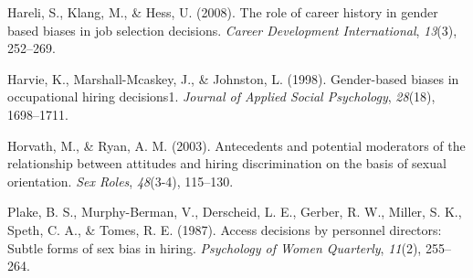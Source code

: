 \documentclass[english,man]{apa6}
\theoremstyle{definition}
\theoremstyle{definition}
\theoremstyle{remark}
\begin{document}
\setlength{\parindent}{-0.5in} \setlength{\leftskip}{0.5in}

\hypertarget{refs}{}
\hypertarget{ref-hareli2008role}{}
Hareli, S., Klang, M., \& Hess, U. (2008). The role of career history in
gender based biases in job selection decisions. \emph{Career Development
International}, \emph{13}(3), 252--269.

\hypertarget{ref-harvie1998gender}{}
Harvie, K., Marshall-Mcaskey, J., \& Johnston, L. (1998). Gender-based
biases in occupational hiring decisions1. \emph{Journal of Applied
Social Psychology}, \emph{28}(18), 1698--1711.

\hypertarget{ref-horvath2003antecedents}{}
Horvath, M., \& Ryan, A. M. (2003). Antecedents and potential moderators
of the relationship between attitudes and hiring discrimination on the
basis of sexual orientation. \emph{Sex Roles}, \emph{48}(3-4), 115--130.

\hypertarget{ref-plake1987access}{}
Plake, B. S., Murphy-Berman, V., Derscheid, L. E., Gerber, R. W.,
Miller, S. K., Speth, C. A., \& Tomes, R. E. (1987). Access decisions by
personnel directors: Subtle forms of sex bias in hiring.
\emph{Psychology of Women Quarterly}, \emph{11}(2), 255--264.
\end{document}
